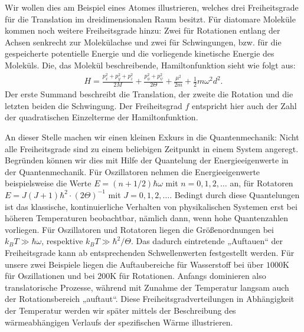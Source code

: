 Wir wollen dies am Beispiel eines Atomes illustrieren, welches drei Freiheitsgrade für die Translation im dreidimensionalen Raum besitzt. Für diatomare Moleküle kommen noch weitere Freiheitsgrade hinzu: Zwei für Rotationen entlang der Achsen senkrecht zur Molekülachse und zwei für Schwingungen, bzw. für die gespeicherte potentielle Energie und die vorliegende kinetische Energie des Moleküls.
Die, das Molekül beschreibende, Hamiltonfunktion sieht wie folgt aus: 
\begin{align*}
    H=\frac{p_x^2+p_y^2+p_z^2}{2M}+\frac{p_{\phi}^2+p_{\psi}^2}{2\Theta}+\frac{\mu^2}{2m}+\frac{1}{2}m\omega^2d^2.
\end{align*}
Der erste Summand beschreibt die Translation, der zweite die Rotation und die letzten beiden die Schwingung.
Der Freiheitsgrad $f$ entspricht hier auch der Zahl der quadratischen Einzelterme der Hamiltonfunktion.

An dieser Stelle machen wir einen kleinen Exkurs in die Quantenmechanik:
Nicht alle Freiheitsgrade sind zu einem beliebigen Zeitpunkt in einem System angeregt. Begründen können wir dies mit Hilfe der Quantelung der Energieeigenwerte in der Quantenmechanik.
Für Oszillatoren nehmen die Energieeigenwerte beispielsweise die Werte $E=(n+1/2)\hbar\omega$ mit $n=0,1,2,\ldots$ an, für Rotatoren $E=J(J+1)\hbar^2\cdot(2\Theta)^{-1}$ mit $J=0,1,2,\ldots$. 
Bedingt durch diese Quantelungen ist das klassische, kontinuierliche Verhalten von physikalischen Systemen erst bei höheren Temperaturen beobachtbar, nämlich dann, wenn hohe Quantenzahlen vorliegen. Für Oszillatoren und Rotatoren liegen die Größenordnungen bei $k_BT\gg\hbar\omega $, respektive $k_BT\gg\hbar^2/\Theta$. 
Das dadurch eintretende „Auftauen“ der Freiheitsgrade kann ab entsprechenden Schwellenwerten festgestellt werden. Für unsere zwei Beispiele liegen die Auftaubereiche für Wasserstoff bei über $1000$K für Oszillationen und bei $200$K für Rotationen.
Anfangs dominieren also translatorische Prozesse, während mit Zunahme der Temperatur langsam auch der Rotationsbereich „auftaut“. 
Diese Freiheitsgradverteilungen in Abhängigkeit der Temperatur werden wir später mittels der Beschreibung des wärmeabhängigen Verlaufs der spezifischen Wärme illustrieren.

